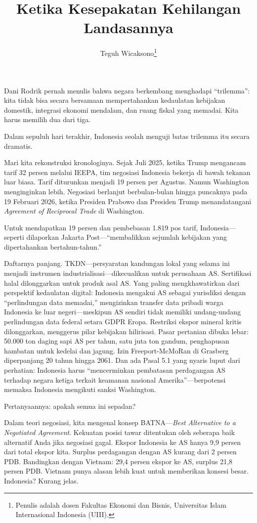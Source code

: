 \documentclass[12pt,a4paper]{article}
\title{\textbf{Ketika Kesepakatan Kehilangan Landasannya}}
\author{Teguh Wicaksono\thanks{Penulis adalah dosen Fakultas Ekonomi dan Bisnis, Universitas Islam Internasional Indonesia (UIII).}}
\date{}
\begin{document}
\maketitle
\thispagestyle{empty}

\onehalfspacing

Dani Rodrik pernah menulis bahwa negara berkembang menghadapi ``trilemma'': kita tidak bisa secara bersamaan mempertahankan kedaulatan kebijakan domestik, integrasi ekonomi mendalam, dan ruang fiskal yang memadai. Kita harus memilih dua dari tiga.

Dalam sepuluh hari terakhir, Indonesia seolah menguji batas trilemma itu secara dramatis.

Mari kita rekonstruksi kronologinya. Sejak Juli 2025, ketika Trump mengancam tarif 32 persen melalui IEEPA, tim negosiasi Indonesia bekerja di bawah tekanan luar biasa. Tarif diturunkan menjadi 19 persen per Agustus. Namun Washington menginginkan lebih. Negosiasi berlanjut berbulan-bulan hingga puncaknya pada 19 Februari 2026, ketika Presiden Prabowo dan Presiden Trump menandatangani \textit{Agreement of Reciprocal Trade} di Washington.

Untuk mendapatkan 19 persen dan pembebasan 1.819 pos tarif, Indonesia---seperti dilaporkan Jakarta Post---``membalikkan sejumlah kebijakan yang dipertahankan bertahun-tahun.''

Daftarnya panjang. TKDN---persyaratan kandungan lokal yang selama ini menjadi instrumen industrialisasi---dikecualikan untuk perusahaan AS. Sertifikasi halal dilonggarkan untuk produk asal AS. Yang paling mengkhawatirkan dari perspektif kedaulatan digital: Indonesia mengakui AS sebagai yurisdiksi dengan ``perlindungan data memadai,'' mengizinkan transfer data pribadi warga Indonesia ke luar negeri---meskipun AS sendiri tidak memiliki undang-undang perlindungan data federal setara GDPR Eropa. Restriksi ekspor mineral kritis dilonggarkan, menggerus pilar kebijakan hilirisasi. Pasar pertanian dibuka lebar: 50.000 ton daging sapi AS per tahun, satu juta ton gandum, penghapusan hambatan untuk kedelai dan jagung. Izin Freeport-McMoRan di Grasberg diperpanjang 20 tahun hingga 2061. Dan ada Pasal 5.1 yang nyaris luput dari perhatian: Indonesia harus ``mencerminkan pembatasan perdagangan AS terhadap negara ketiga terkait keamanan nasional Amerika''---berpotensi memaksa Indonesia mengikuti sanksi Washington.

Pertanyaannya: apakah semua ini sepadan?

Dalam teori negosiasi, kita mengenal konsep BATNA---\textit{Best Alternative to a Negotiated Agreement}. Kekuatan posisi tawar ditentukan oleh seberapa baik alternatif Anda jika negosiasi gagal. Ekspor Indonesia ke AS hanya 9,9 persen dari total ekspor kita. Surplus perdagangan dengan AS kurang dari 2 persen PDB. Bandingkan dengan Vietnam: 29,4 persen ekspor ke AS, surplus 21,8 persen PDB. Vietnam punya alasan lebih kuat untuk memberikan konsesi besar. Indonesia? Kurang jelas.
\end{document}
